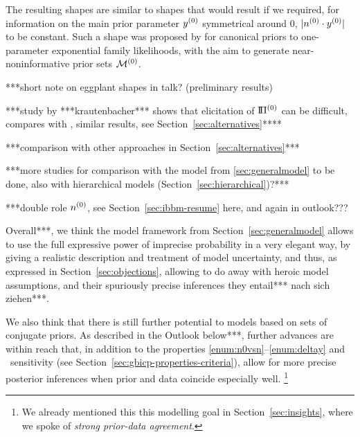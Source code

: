 The resulting shapes are similar to shapes that would result
if we required, for information on the main prior parameter $y^{(0)}$ symmetrical around $0$,
$|n^{(0)} \cdot y^{(0)}|$ to be constant.
Such a shape was proposed by \textcite{2012:benavolizaffalon}
for canonical priors to one-parameter exponential family likelihoods,
with the aim to generate near-noninformative prior sets $\mathcal{M}^{(0)}$.



***short note on eggplant shapes in talk? (preliminary results)


***study by ***krautenbacher*** shows that elicitation of $\text{I}\!\Pi^{(0)}$ can be difficult,
compares with \textcite{2005:whitcomb}, similar results, see Section~\ref{sec:alternatives}****

***comparison with other approaches in Section~\ref{sec:alternatives}***

***more studies for comparison with the model from \ref{sec:generalmodel} to be done,
also with hierarchical models (Section~\ref{sec:hierarchical})?***


***double role $n^{(0)}$, see Section~\ref{sec:ibbm-resume} here, and again in outlook???



Overall***, we think the model framework from Section~\ref{sec:generalmodel}
allows to use the full expressive power of imprecise probability %
in a very elegant way, by giving a realistic description and treatment
of model uncertainty, and thus, as expressed in Section~\ref{sec:objections},
allowing to do away with heroic model assumptions, and their spuriously precise inferences they entail*** nach sich ziehen***.

We also think that there is still further potential to models based on sets of conjugate priors.
As described in the Outlook below***,
further advances are within reach 
that, in addition to the properties \ref{enum:n0vsn}--\ref{enum:deltay} and \pdc\ sensitivity
(see Section~\ref{sec:gbicp-properties-criteria}),
allow for more precise posterior inferences when prior and data coincide especially well.%
\footnote{We already mentioned this this modelling goal in Section~\ref{sec:insights},
where we spoke of \emph{strong prior-data agreement}.}



